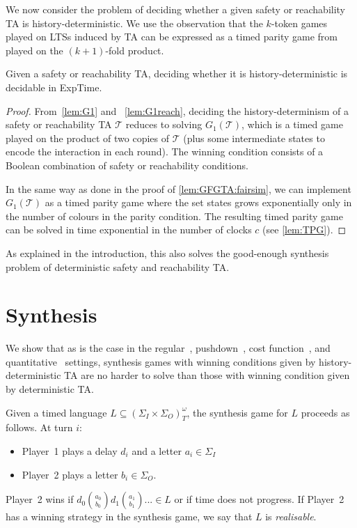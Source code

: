 \documentclass[10pt,a4paper]{amsart}
\theoremstyle{definition}
\numberwithin{equation}{section}
\newcommand{\T}{\mathcal{T}}
\newcommand{\exptime}{\EXPTIME}
\newcommand{\EXPTIME}{{\sc ExpTime}}
\begin{document}
We now consider the problem of deciding whether a given safety or reachability TA
is history-deterministic. We use the observation that
the $k$-token games played on LTSs induced by TA can be expressed as a timed parity game from~\cite{CHP08} played on the $(k+1)$-fold product.


\begin{theorem}\label{thm:decidable}
Given a safety or reachability TA, deciding whether it is history-deterministic is decidable in \exptime.
\end{theorem}
\begin{proof}
From~\cref{lem:G1} and ~\cref{lem:G1reach}, deciding the history-determinism of a safety or reachability TA $\T$ reduces to solving $G_1(\T)$, which is a timed game played on the product of two copies of $\T$ (plus some intermediate states to encode the interaction in each round). The winning condition consists of a Boolean combination of safety or reachability conditions.

In the same way as done in the proof of \cref{lem:GFGTA:fairsim}, we can implement $G_1(\T)$ as a timed parity
game where the set states grows exponentially only in the number of colours in the parity condition.
The resulting timed parity game can be solved in time exponential in the number of clocks $c$ (see
\cref{lem:TPG}).
\end{proof}

As explained in the introduction, this also solves the good-enough synthesis problem of deterministic safety and reachability TA.
	
	
	\section{Synthesis}
	\label{sec_synthesis}
	\label{sec:synthesis}
We show that as is the case in the regular~\cite{HP06}, pushdown~\cite{LZ22}, cost function~\cite{Col09}, and quantitative~\cite{BL21} settings, synthesis games with winning conditions given by history-deterministic TA are no harder to solve than those with winning condition given by deterministic TA.


\begin{definition}
	Given a timed language $L\subseteq (\Sigma_I\times \Sigma_O)^\omega_T$, the synthesis game for $L$ proceeds as follows.
	At turn $i$:
	\begin{itemize}
		\item Player~1 plays a delay $d_i$ and a letter $a_i\in \Sigma_I$
		\item Player~2 plays a letter $b_i\in \Sigma_O$.
	\end{itemize}
	Player~2 wins if $d_0\binom{a_0}{b_0}d_1\binom{a_1}{b_1}...\in L$ or if time does not progress.
If Player~2 has a winning strategy in the synthesis game, we say that $L$ is \emph{realisable}.
\end{definition}
\end{document}
